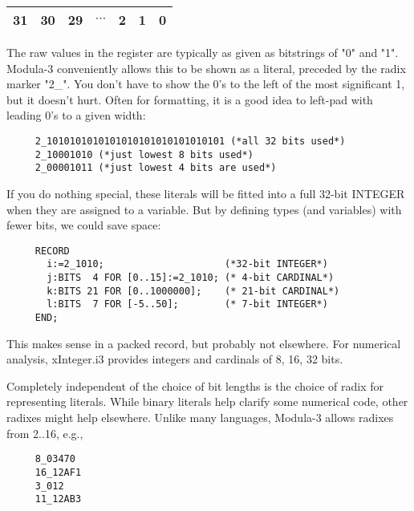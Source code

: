 \begin{center}
\begin{tabular}{|c|c|c|c|c|c|c|} \hline
    31 & 30 & 29 & $\cdots$ & 2 & 1 & 0 \\ \hline
\end{tabular}    
\end{center}

The raw values in the register are typically as given as
bitstrings of "0" and "1".  Modula-3 conveniently allows
this to be shown as a literal, preceded by the radix marker
"2\_".  You don't have to show the 0's to the left of the
most significant 1, but it doesn't hurt.  Often for
formatting, it is a good idea to left-pad with leading 0's
to a given width:

\begin{tt} \begin{verbatim}
     2_1010101010101010101010101010101 (*all 32 bits used*)
     2_10001010 (*just lowest 8 bits used*)
     2_00001011 (*just lowest 4 bits are used*)
\end{verbatim} \end{tt}

If you do nothing special, these literals will be fitted
into a full 32-bit INTEGER when they are assigned to a
variable.  But by defining types (and variables) with fewer
bits, we could save space:

\begin{tt} \begin{verbatim}
     RECORD
       i:=2_1010;                     (*32-bit INTEGER*)
       j:BITS  4 FOR [0..15]:=2_1010; (* 4-bit CARDINAL*)
       k:BITS 21 FOR [0..1000000];    (* 21-bit CARDINAL*)
       l:BITS  7 FOR [-5..50];        (* 7-bit INTEGER*)
     END;
\end{verbatim} \end{tt}

This makes sense in a packed record, but probably not
elsewhere.  For numerical analysis, xInteger.i3 provides integers
and cardinals of 8, 16, 32 bits.

Completely independent of the choice of bit lengths is the
choice of radix for representing literals.  While binary
literals help clarify some numerical code, other radixes
might help elsewhere.  Unlike many languages, Modula-3
allows radixes from 2..16, e.g.,
\begin{tt} \begin{verbatim}
     8_03470
     16_12AF1
     3_012
     11_12AB3
\end{verbatim} \end{tt}

